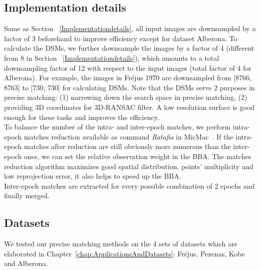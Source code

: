 \subsection{Implementation details}
Same as Section ~\ref{Implementationdetails}, all input images are downsampled by a factor of 3 beforehand to improve efficiency except for dataset Alberona. To calculate the DSMs, we further downsample the images by a factor of 4 (different from 8 in Section ~\ref{Implementationdetails}), which amounts to a total downsampling factor of 12 with respect to the input images (total factor of 4 for Alberona). For example, the images in Fr{\'e}jus 1970 are downsampled from [8766, 8763] to [730, 730] for calculating DSMs. 
Note that the DSMs serve 2 purposes in precise matching: (1) narrowing down the search space in precise matching, (2) providing 3D coordinates for 3D-RANSAC filter. A low resolution surface is good enough for these tasks and improves the efficiency.\\
To balance the number of the intra- and inter-epoch matches, we perform intra-epoch matches reduction available as command \textit{Ratafia} in MicMac~\cite{marc2016micmac}. %
If the intra-epoch matches after reduction are still obviously more numerous than the inter-epoch ones, we can set the relative observation weight in the \ac{BBA}. The matches reduction algorithm maximizes good spatial distribution, points' multiplicity and low reprojection error, it also helps to speed up the \ac{BBA}.\\
Inter-epoch matches are extracted {for every possible combination of 2 epochs and finally merged}.\\


\subsection{Datasets}
We tested our precise matching methods on the 4 sets of datasets which are elaborated in Chapter~\ref{chap:ApplicationsAndDatasets}: Fr{\'e}jus, Pezenas, Kobe and Alberona.

